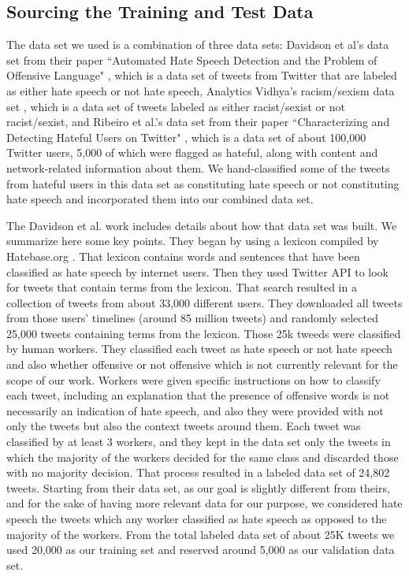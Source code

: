 \documentclass[conference]{sig-alternate-05-2015}
\begin{document}
\subsection{Sourcing the Training and Test Data}
The data set we used is a combination of three data sets: Davidson et al's data set from their paper ``Automated Hate Speech Detection and the Problem of Offensive Language" \cite{davidson2017automated}, which is a data set of tweets from Twitter that are labeled as either hate speech or not hate speech, Analytics Vidhya's racism/sexism data set \cite{vidhya}, which is a data set of tweets labeled as either racist/sexist or not racist/sexist, and Ribeiro et al.'s data set from their paper ``Characterizing and Detecting Hateful Users on Twitter" \cite{ribeiro2017like}, which is a data set of about 100,000 Twitter users, 5,000 of which were flagged as hateful, along with content and network-related information about them. We hand-classified some of the tweets from hateful users in this data set as constituting hate speech or not constituting hate speech and incorporated them into our combined data set.

The Davidson et al. work includes details about how that data set was built. We summarize here some key points. They began by using a lexicon compiled by Hatebase.org \cite{HateBaseOrg}. That lexicon contains words and sentences that have been classified as hate speech by internet users. Then they used Twitter API to look for tweets that contain terms from the lexicon. That search resulted in a collection of tweets from about 33,000 different users. They downloaded all tweets from those users' timelines (around 85 million tweets) and randomly selected 25,000 tweets containing terms from the lexicon. Those 25k tweeds were classified by human workers. They classified each tweet as hate speech or not hate speech and also whether offensive or not offensive which is not currently relevant for the scope of our work. Workers were given specific instructions on how to classify each tweet, including an explanation that the presence of offensive words is not necessarily an indication of hate speech, and also they were provided with not only the tweets but also the context tweets around them. Each tweet was classified by at least 3 workers, and they kept in the data set only the tweets in which the majority of the workers decided for the same class and discarded those with no majority decision.  That process resulted in a labeled data set of 24,802 tweets.
Starting from their data set, as our goal is slightly different from theirs, and for the sake of having more relevant data for our purpose,  we considered hate speech the tweets which any worker classified as hate speech as opposed to the majority of the workers. 
From the total labeled data set of about 25K tweets we used 20,000 as our training set and reserved around 5,000 as our validation data set.
\end{document}
